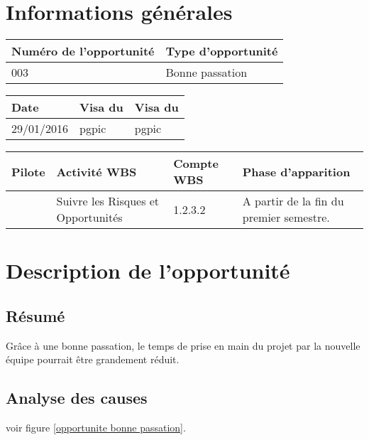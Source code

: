 \section*{Informations générales}
 
\begin{table}[h]
\centering
	\begin{tabularx}{16.8cm}{|X|X|}
	\hline
	\rowcolor{gray!40} Numéro de l'opportunité & Type d'opportunité \\
	\hline
	003 & Bonne passation \\
	\hline
	\end{tabularx}
\end{table}

\begin{table}[h]
\centering
	\begin{tabularx}{16.8cm}{|X|X|X|}
	\hline
	\rowcolor{gray!40} Date & Visa du \RQ & Visa du \CP \\
	\hline
	 29/01/2016 & pgpic & pgpic \\
	\hline
	\end{tabularx}
\end{table}

\begin{table}[h]
\centering
	\begin{tabularx}{16.8cm}{|X|X|X|X|}
	\hline
	\rowcolor{gray!40} Pilote & Activité WBS & Compte WBS & Phase d'apparition \\
	\hline
	 \Francois & Suivre les Risques et Opportunités & 1.2.3.2 & A partir de la fin du premier semestre.\\
	\hline
	\end{tabularx}
\end{table}

\section*{Description de l'opportunité}

\subsection*{Résumé}
	Grâce à une bonne passation, le temps de prise en main du projet par la nouvelle équipe pourrait être grandement réduit.
	
\subsection*{Analyse des causes}
	voir figure \ref{opportunite bonne passation}.

